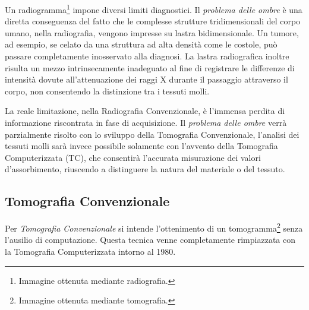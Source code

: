 \documentclass[a4paper,12pt, doubleside]{report}
\begin{document}
                \bigskip 
                \par
                    Un radiogramma\footnote{Immagine ottenuta mediante radiografia.} impone diversi limiti diagnostici. Il \textit{problema delle ombre} è una diretta conseguenza del fatto che le complesse strutture tridimensionali del corpo umano, nella radiografia, vengono impresse su lastra bidimensionale. Un tumore, ad esempio, se celato da una struttura ad alta densità come le costole, può passare completamente inosservato alla diagnosi. La lastra radiografica inoltre risulta un mezzo intrinsecamente inadeguato al fine di registrare le differenze di intensità dovute all'attenuazione dei raggi X durante il passaggio attraverso il corpo, non consentendo la distinzione tra i tessuti molli.
                
                \bigskip            
                \par
                    La reale limitazione, nella Radiografia Convenzionale, è l'immensa perdita di informazione riscontrata in fase di acquisizione. Il \textit{problema delle ombre} verrà parzialmente risolto con lo sviluppo della Tomografia Convenzionale, l'analisi dei tessuti molli sarà invece possibile solamente con l'avvento della Tomografia Computerizzata (TC), che consentirà l'accurata misurazione dei valori d'assorbimento, riuscendo a distinguere la natura del materiale o del tessuto.
                            
            \subsection{Tomografia Convenzionale}
            \label{sub:TomografiaConvenzionale}
                \par
                    Per \textit{Tomografia Convenzionale} si intende l'ottenimento di un tomogramma\footnote{Immagine ottenuta mediante tomografia.} senza l'ausilio di computazione. Questa tecnica venne completamente rimpiazzata con la Tomografia Computerizzata intorno al 1980.
                
\end{document}
